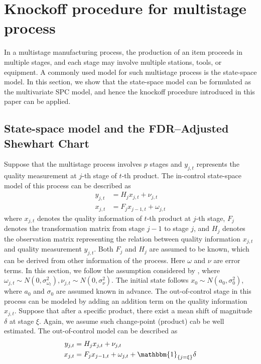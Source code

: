 \documentclass[a4paper,12pt]{article}
\begin{document}
\section{Knockoff procedure for multistage process}
In a multistage manufacturing process, the production of an item proceeds in multiple stages, and each stage may involve multiple stations, tools, or equipment. A commonly used model for such multistage process is the state-space model. In this section, we show that the state-space model can be formulated as the multivariate SPC model, and hence the knockoff procedure introduced in this paper can be applied. 

\subsection{State-space model and the FDR–Adjusted Shewhart Chart}
Suppose that the multistage process involves $p$ stages and $y_{j,t}$ represents the quality measurement at $j$-th stage of $t$-th product. The in-control state-space model of this process can be described as
\begin{equation}\label{incontrol}
\begin{split}
y_{j,t} &= H_j x_{j,t} + \nu_{j,t} \\
x_{j,t} &= F_j x_{j-1,t} + \omega_{j,t}
\end{split}
\end{equation}
where $x_{j,t}$ denotes the quality information of $t$-th product at $j$-th stage, $ F_j$ denotes the transformation matrix from stage $j-1$ to stage $j$, and $ H_j$ denotes the observation matrix representing the relation between quality information $x_{j,t}$ and quality measurement $y_{j,t}$. Both $F_j$ and $H_j$ are assumed to be known, which can be derived from other information of the process. Here $\omega$ and $\nu$ are error terms. In this section, we follow the assumption considered by \cite{xiang2008statistical}, where $\omega_{j,t} \sim N(0, \sigma^2_{\omega_t}), \nu_{j,t} \sim N(0,\sigma^2_\nu)$. The initial state follows $x_0 \sim N(a_0, \sigma_0^2)$, where $a_0$ and $\sigma_0$ are assumed known in advance. The out-of-control stage in this process can be modeled by adding an addition term on the quality information $x_{j,t}$. Suppose that after a specific product, there exist a mean shift of magnitude $\delta$ at stage $\xi$. Again, we assume such change-point (product) cab be well estimated. The out-of-control model can be described as 
\begin{equation}\label{outcontrol}
\begin{split}
y_{j,t} &= H_j x_{j,t} + \nu_{j,t} \\
x_{j,t} &= F_j x_{j-1,t} + \omega_{j,t} + \mathbbm{1}_{\{j=\xi\}} \delta
\end{split}
\end{equation}
\end{document}
